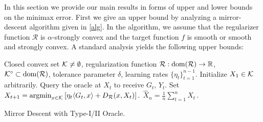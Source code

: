 In this section we provide our main results in forms of upper and lower bounds on the minimax error.
First we give an upper bound by analyzing a mirror-descent algorithm given in \cref{alg}.
In the algorithm, we assume that the regularizer function $\mathcal{R}$ is $\alpha$-strongly convex and the target function $f$ is smooth or  smooth and strongly convex. A standard analysis yields the following upper bounds:

%

\begin{algorithm}[t]
\begin{algorithmic}
      Closed convex set $\mathcal{K}\ne \emptyset$, regularization function $\mathcal{R}:\operatorname{dom}(\mathcal{R})\to \mathbb{R}$, $\mathcal{K}^{\circ}\subset \operatorname{dom}(\mathcal{R})$, tolerance parameter $\delta$, learning rates $\{\eta_t\}_{t=1}^{n-1}$.
\State Initialize $X_1\in \mathcal{K}$ arbitrarily.
	\State Query the oracle at $X_t$ to receive $G_t$, $Y_t$.
	\State Set
	$X_{t+1}=\operatorname{argmin}_{x\in \mathcal{K}}\left[ \eta_{t} \langle G_t,x \rangle+D_{\mathcal{R}}(x,X_t) \right].$
\EndFor
{} $\hat{X}_n = \frac{1}{n}\sum_{t=1}^n X_t \,.$
\end{algorithmic}
\caption{Mirror Descent with Type-I/II Oracle.
\label{alg}}
\end{algorithm}


%

